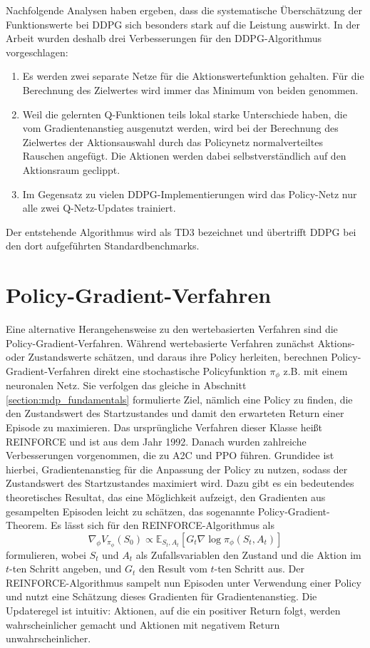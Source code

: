 Nachfolgende Analysen haben ergeben, dass die systematische Überschätzung der Funktionswerte bei DDPG sich besonders stark auf die Leistung auswirkt.
In der Arbeit \cite{DBLP:journals/corr/abs-1802-09477} wurden deshalb drei Verbesserungen für den DDPG-Algorithmus vorgeschlagen:
\begin{enumerate}
	\item Es werden zwei separate Netze für die Aktionswertefunktion gehalten.
	Für die Berechnung des Zielwertes wird immer das Minimum von beiden genommen.
	\item Weil die gelernten Q-Funktionen teils lokal starke Unterschiede haben, die vom Gradientenanstieg ausgenutzt werden, wird bei der Berechnung des Zielwertes der Aktionsauswahl durch das Policynetz normalverteiltes Rauschen angefügt.
	Die Aktionen werden dabei selbstverständlich auf den Aktionsraum geclippt.
	\item Im Gegensatz zu vielen DDPG-Implementierungen wird das Policy-Netz nur alle zwei Q-Netz-Updates trainiert.
\end{enumerate}
Der entstehende Algorithmus wird als TD3 bezeichnet und übertrifft DDPG bei den dort aufgeführten Standardbenchmarks.

\section{Policy-Gradient-Verfahren}
Eine alternative Herangehensweise zu den wertebasierten Verfahren sind die Policy-Gradient-Verfahren.
Während wertebasierte Verfahren zunächst Aktions- oder Zustandswerte schätzen, und daraus ihre Policy herleiten, berechnen Policy-Gradient-Verfahren direkt eine stochastische Policyfunktion $\pi_\phi$ z.B. mit einem neuronalen Netz.
Sie verfolgen das gleiche in Abschnitt \ref{section:mdp_fundamentals} formulierte Ziel, nämlich eine Policy zu finden, die den Zustandswert des Startzustandes und damit den erwarteten Return einer Episode zu maximieren.
Das ursprüngliche Verfahren dieser Klasse heißt REINFORCE \cite{10.1007/BF00992696} und ist aus dem Jahr 1992.
Danach wurden zahlreiche Verbesserungen vorgenommen, die zu A2C und PPO führen.
Grundidee ist hierbei, Gradientenanstieg für die Anpassung der Policy zu nutzen, sodass der Zustandswert des Startzustandes maximiert wird.
Dazu gibt es ein bedeutendes theoretisches Resultat, das eine Möglichkeit aufzeigt, den Gradienten aus gesampelten Episoden leicht zu schätzen, das sogenannte Policy-Gradient-Theorem.
Es lässt sich für den REINFORCE-Algorithmus als
\begin{equation}
	\nabla_\phi V_{\pi_\phi}(S_0) \propto \mathbb{E}_{S_t, A_t}\left[G_t \nabla\log{\pi_\phi(S_t, A_t)}\right]
\end{equation}
formulieren, wobei $S_t$ und $A_t$ als Zufallsvariablen den Zustand und die Aktion im $t$-ten Schritt angeben, und $G_t$ den Result vom $t$-ten Schritt aus.
Der REINFORCE-Algorithmus sampelt nun Episoden unter Verwendung einer Policy und nutzt eine Schätzung dieses Gradienten für Gradientenanstieg.
Die Updateregel ist intuitiv: Aktionen, auf die ein positiver Return folgt, werden wahrscheinlicher gemacht und Aktionen mit negativem Return unwahrscheinlicher.

